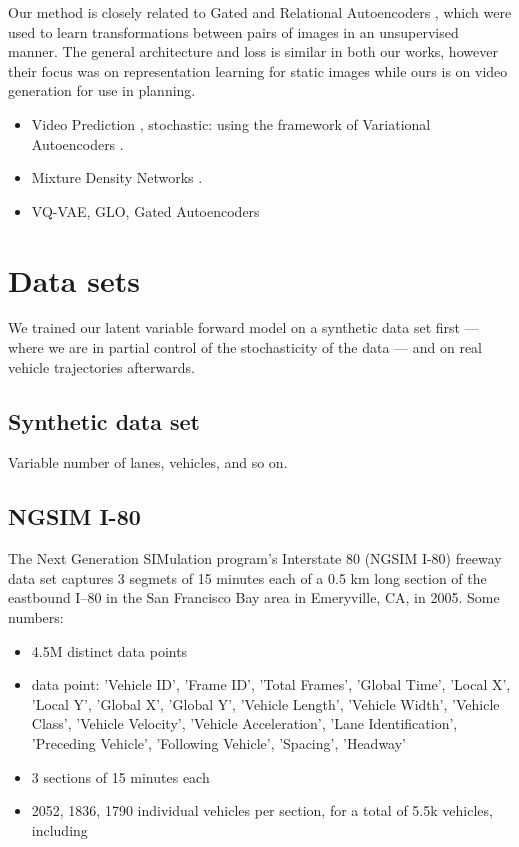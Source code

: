 \documentclass{article}
\begin{document}
Our method is closely related to Gated and Relational Autoencoders \citep{RelationalAE, GAE}, which were used to learn transformations between pairs of images in an unsupervised manner.
The general architecture and loss is similar in both our works, however their focus was on representation learning for static images while ours is on video generation for use in planning.

\begin{itemize}
\item Video Prediction \citep{mathieu-iclr-2016}, stochastic:  using the framework of Variational Autoencoders \citep{VAE}.
\item Mixture Density Networks \citep{mixture-density-networks}.
\item VQ-VAE, GLO, Gated Autoencoders
\end{itemize}


\section{Data sets}
We trained our latent variable forward model on a synthetic data set first --- where we are in partial control of the stochasticity of the data --- and on real vehicle trajectories afterwards.

\subsection{Synthetic data set}
Variable number of lanes, vehicles, and so on.  %

\subsection{NGSIM I-80}
The Next Generation SIMulation program's Interstate 80 (NGSIM I-80) freeway data set \cite{halkias2006ngsim} captures 3 segmets of 15 minutes each of a 0.5 km long section of the eastbound I–80 in the San Francisco Bay area in Emeryville, CA, in 2005.
Some numbers:
\begin{itemize}
  \item 4.5M distinct data points
  \item data point: 'Vehicle ID', 'Frame ID', 'Total Frames', 'Global Time', 'Local X', 'Local Y', 'Global X', 'Global Y', 'Vehicle Length', 'Vehicle Width', 'Vehicle Class', 'Vehicle Velocity', 'Vehicle Acceleration', 'Lane Identification', 'Preceding Vehicle', 'Following Vehicle', 'Spacing', 'Headway'
  \item 3 sections of 15 minutes each
  \item 2052, 1836, 1790 individual vehicles per section, for a total of 5.5k vehicles, including

\end{itemize}
\end{document}
